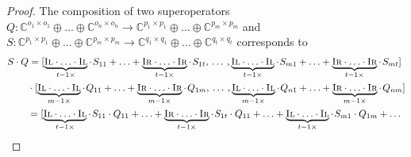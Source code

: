 \begin{proof}
The composition of two superoperators $Q: \mathbb{C}^{o_1 \times o_1} \oplus \ldots \oplus \mathbb{C}^{o_n \times o_n}  \rightarrow \mathbb{C}^{p_1 \times p_1} \oplus \ldots \oplus  \mathbb{C}^{p_m \times p_m}$ and $S: \mathbb{C}^{p_1 \times p_1} \oplus \ldots \oplus \mathbb{C}^{p_m \times p_m}  \rightarrow \mathbb{C}^{q_1 \times q_1} \oplus \ldots \oplus \mathbb{C}^{q_t \times q_t}$ corresponds to 
\begin{equation}
  \begin{split}
    & S \cdot  Q =[\underbrace{\textsc{Il} \cdot \ldots \cdot \textsc{Il}}_{t-1 \times} \cdot \hspace{1pt} S_{11} + \ldots +   \underbrace{\textsc{Ir} \cdot \ldots \cdot \textsc{Ir}}_{t-1 \times}\cdot \hspace{1pt} S_{1t},  \hspace{2pt} \ldots  \hspace{2pt},  \underbrace{\textsc{Il} \cdot \ldots \cdot \textsc{Il}}_{t-1 \times} \cdot\hspace{1pt} S_{m1} + \ldots + \underbrace{\textsc{Ir} \cdot \ldots \cdot \textsc{Ir}}_{t-1 \times}\cdot \hspace{1pt} S_{mt}] \\
     & \hspace{21pt}\cdot  [\underbrace{\textsc{Il} \cdot \ldots \cdot \textsc{Il}}_{m-1 \times} \cdot \hspace{1pt} Q_{11} + \ldots +   \underbrace{\textsc{Ir} \cdot \ldots \cdot \textsc{Ir}}_{m-1 \times}\cdot \hspace{1pt} Q_{1m},  \hspace{2pt} \ldots  \hspace{2pt},  \underbrace{\textsc{Il} \cdot \ldots \cdot \textsc{Il}}_{m-1 \times} \cdot\hspace{1pt} Q_{n1} + \ldots + \underbrace{\textsc{Ir} \cdot \ldots \cdot \textsc{Ir}}_{m-1 \times}\cdot \hspace{1pt} Q_{nm}]  \\
     & \hspace{21pt} = [ \underbrace{\textsc{Il} \cdot \ldots \cdot \textsc{Il}}_{t-1 \times} \cdot \hspace{1pt} S_{11} \cdot Q_{11} + \ldots +   \underbrace{\textsc{Ir} \cdot \ldots \cdot \textsc{Ir}}_{t-1 \times}\cdot \hspace{1pt} S_{1t} \cdot Q_{11} + \ldots +  \underbrace{\textsc{Il} \cdot \ldots \cdot \textsc{Il}}_{t-1 \times} \cdot\hspace{1pt} S_{m1} \cdot Q_{1m} +  \ldots \\

\end{split}
\end{equation}
\end{proof}
